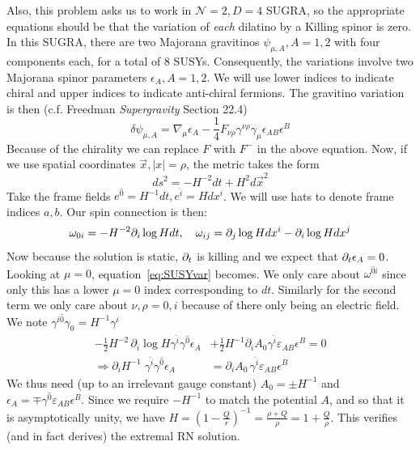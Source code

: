 \documentclass[11pt, class=article, crop=false]{standalone}
\begin{document}
\begin{enumerate}
	Also, this problem asks us to work in $\mathcal N =2, D = 4$ SUGRA, so the appropriate equations should be that the variation of \emph{each} dilatino by a Killing spinor is zero. In this SUGRA, there are two Majorana gravitinos $
\psi_{\mu, A}, A=1,2$ with four components each, for a total of $8$ SUSYs. Consequently, the variations involve two Majorana spinor parameters $\epsilon_{A}, A=1,2$. We will use lower indices to indicate chiral and upper indices to indicate anti-chiral fermions. The gravitino variation is then (c.f. Freedman \emph{Supergravity} Section 22.4)
\begin{equation}\label{eq:SUSYvar}
		\delta \psi_{\mu, A} = \nabla_\mu \epsilon_A - \frac14 F_{\nu \rho} \gamma^{\nu \rho} \gamma_\mu \epsilon_{AB} \epsilon^B
\end{equation}
	Because of the chirality we can replace $F$ with $F^-$ in the above equation. Now, if we use spatial coordinates $\vec x, |x| = \rho$, the metric takes the form
	\[
		ds^2 = -H^{-2} dt + H^2 d\vec x^2 
	\]
	Take the frame fields $e^{\hat 0} = H^{-1} dt, e^{\hat i} = H dx^i$. We will use hats to denote frame indices $a,b$. Our spin connection is then:
	\[
		\omega_{0i} = - H^{-2} \partial_i \log H dt, \quad \omega_{ij} = \partial_j \log H dx^i -\partial_i \log H dx^j
	\]
	Now because the solution is static, $\partial_t$ is killing and we expect that $\partial_t \epsilon_A = 0$. Looking at $\mu = 0$, equation~\eqref{eq:SUSYvar} becomes. We only care about $\omega^{\hat 0 \hat i}$ since only this has a lower $\mu = 0$ index corresponding to $dt$. Similarly for the second term we only care about $\nu,\rho = 0,i$ because of there only being an electric field. We note $\gamma^{i \hat 0} \gamma_{0} = H^{-1} \gamma^i$
	\[
	\begin{aligned}
		-\frac12 H^{-2} \, \partial_i \log H \gamma^{\hat i} \gamma^{\hat 0} \epsilon_A &+ \frac12 H^{-1} \partial_i A_0 \gamma^{\hat i} \varepsilon_{AB} \epsilon^B = 0\\
		 \Rightarrow \partial_i H^{-1} \; \gamma^{\hat i} \gamma^{\hat 0} \epsilon_A &= \partial_i A_0 \, \gamma^{\hat i} \varepsilon_{AB} \epsilon^B
	\end{aligned}
	\]
	We thus need (up to an irrelevant gauge constant) $A_0 = \pm H^{-1}$ and $\epsilon_A = \mp \gamma^{\hat 0} \varepsilon_{AB} \epsilon^B$. Since we require $-H^{-1}$ to match the potential $A$, and so that it is asymptotically unity, we have $H = (1 - \frac{Q}{r})^{-1} = \frac{\rho+Q}{\rho} = 1 + \frac{Q}{\rho}$. This verifies (and in fact derives) the extremal RN solution. 
	

\end{enumerate}
\end{document}
